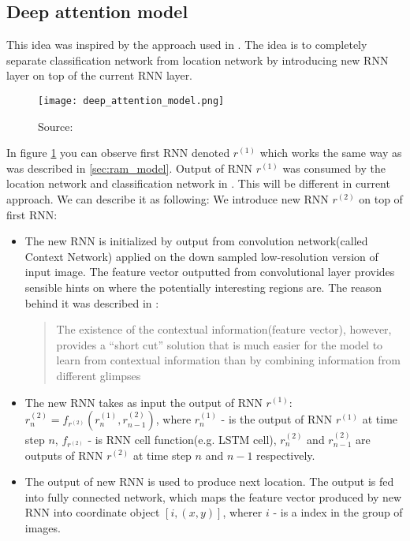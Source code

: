 \subsection{Deep attention model}
\label{subs:deep_att_model}
This idea was inspired by the approach used in \cite{DBLP:journals/corr/BaMK14}.
The idea is to completely separate classification network from location network
by introducing new RNN layer on top of the current RNN layer.

\begin{figure}
	\texttt{[image: deep\_attention\_model.png]}
	\caption{Source: \cite{DBLP:journals/corr/BaMK14}}
	\label{fig:deep_att_model}
\end{figure}

In figure \ref{fig:deep_att_model} you can observe first RNN denoted $r^{(1)}$ which works
the same way as was described in \autoref{sec:ram_model}. Output of RNN $r^{(1)}$
was consumed by the location network and classification network in \cite{DBLP:journals/corr/MnihHGK14}.
This will be different in current approach. We can describe it as following:
We introduce new RNN $r^{(2)}$ on top of first RNN:
\begin{itemize}
	\item The new RNN is initialized by output from convolution
		network(called Context Network) applied on the down
		sampled low-resolution version of input image.
		The feature vector outputted from convolutional layer
		provides sensible hints on where
		the potentially interesting regions are.
		The reason behind it was described in \cite{DBLP:journals/corr/BaMK14}:
		\blockquote{The existence of the contextual information(feature vector),
		however, provides a
		“short cut” solution that is much easier for the model to
		learn from contextual information than by combining information
		from different glimpses}
	\item The new RNN takes as input the output of RNN $r^{(1)}$:
		$r_n^{(2)} = f_{r^{(2)}}(r_n^{(1)}, r_{n-1}^{(2)})$,
		where $r_n^{(1)}$ - is the output of RNN $r^{(1)}$ at time step $n$,
		$f_{r^{(2)}}$ - is RNN cell function(e.g. LSTM cell),
		  $r_n^{(2)}$ and $r_{n-1}^{(2)}$ are outputs of RNN $r^{(2)}$
		  at time step $n$ and $n-1$ respectively.
	\item The output of new RNN is used to produce next location.
		The output is fed into fully connected network, which maps
		the feature vector produced by new RNN into coordinate object $[i, (x,y)]$,
		wherer $i$ - is a index in the group of images.
\end{itemize}

